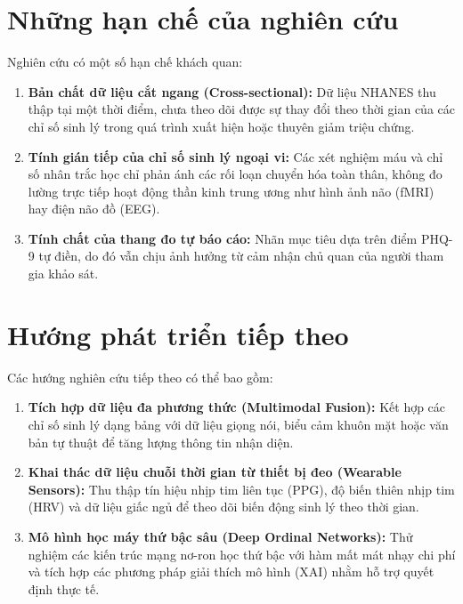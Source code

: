 \section{Những hạn chế của nghiên cứu}
\label{sec:han-che-nghien-cuu}

Nghiên cứu có một số hạn chế khách quan:
\begin{enumerate}
    \item \textbf{Bản chất dữ liệu cắt ngang (Cross-sectional):} Dữ liệu NHANES thu thập tại một thời điểm, chưa theo dõi được sự thay đổi theo thời gian của các chỉ số sinh lý trong quá trình xuất hiện hoặc thuyên giảm triệu chứng.
    \item \textbf{Tính gián tiếp của chỉ số sinh lý ngoại vi:} Các xét nghiệm máu và chỉ số nhân trắc học chỉ phản ánh các rối loạn chuyển hóa toàn thân, không đo lường trực tiếp hoạt động thần kinh trung ương như hình ảnh não (fMRI) hay điện não đồ (EEG).
    \item \textbf{Tính chất của thang đo tự báo cáo:} Nhãn mục tiêu dựa trên điểm PHQ-9 tự điền, do đó vẫn chịu ảnh hưởng từ cảm nhận chủ quan của người tham gia khảo sát.
\end{enumerate}

\section{Hướng phát triển tiếp theo}
\label{sec:huong-phat-trien}

Các hướng nghiên cứu tiếp theo có thể bao gồm:
\begin{enumerate}
    \item \textbf{Tích hợp dữ liệu đa phương thức (Multimodal Fusion):} Kết hợp các chỉ số sinh lý dạng bảng với dữ liệu giọng nói, biểu cảm khuôn mặt hoặc văn bản tự thuật để tăng lượng thông tin nhận diện.
    \item \textbf{Khai thác dữ liệu chuỗi thời gian từ thiết bị đeo (Wearable Sensors):} Thu thập tín hiệu nhịp tim liên tục (PPG), độ biến thiên nhịp tim (HRV) và dữ liệu giấc ngủ để theo dõi biến động sinh lý theo thời gian.
    \item \textbf{Mô hình học máy thứ bậc sâu (Deep Ordinal Networks):} Thử nghiệm các kiến trúc mạng nơ-ron học thứ bậc với hàm mất mát nhạy chi phí và tích hợp các phương pháp giải thích mô hình (XAI) nhằm hỗ trợ quyết định thực tế.
\end{enumerate}
